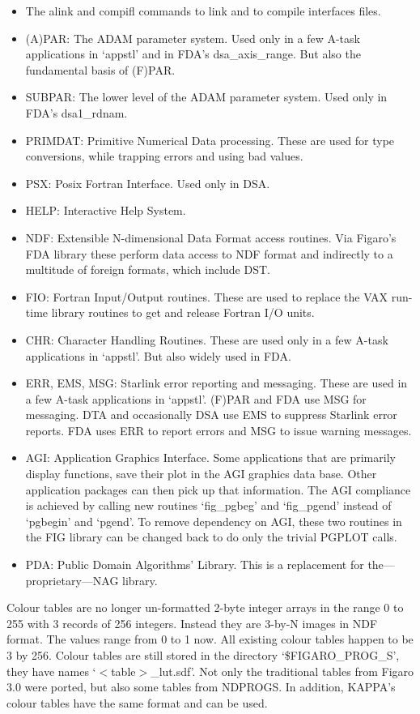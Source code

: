 \documentclass[11pt,twoside]{article}
\newcommand{\latorhtm}[2]{#1}
\newcommand{\latorhtm}[2]{#2}
\begin{document}
\begin{itemize}
\item The alink and compifl commands to link and to compile interfaces
   files.
\item (A)PAR: The ADAM parameter system. Used only in a few A-task
   applications in `appstl' and in FDA's dsa\_axis\_range. But also
   the fundamental basis of (F)PAR.
\item SUBPAR: The lower level of the ADAM parameter system. Used only
   in FDA's dsa1\_\-rdnam.
\item PRIMDAT: Primitive Numerical Data processing. These are used for type
   conversions, while trapping errors and using bad values.
\item PSX: Posix Fortran Interface. Used only in DSA.
\item HELP: Interactive Help System.
\item NDF: Extensible N-dimensional Data Format access routines. Via
   Figaro's FDA library these perform data access to NDF format and
   indirectly to a multitude of foreign formats, which include DST.
\item FIO: Fortran Input/Output routines. These are used to replace the
   VAX run-time library routines to get and release Fortran I/O units.
\item CHR: Character Handling Routines. These are used only in a few
   A-task applications in `appstl'. But also widely used in FDA.
\item ERR, EMS, MSG: Starlink error reporting and messaging. These are
   used in a few A-task applications in `appstl'. (F)PAR and FDA use MSG
   for messaging. DTA and occasionally DSA use EMS to suppress
   Starlink error reports. FDA uses ERR to report errors and MSG to
   issue warning messages.
\item AGI: Application Graphics Interface. Some applications that are
   primarily display functions, save their plot in the AGI graphics data
   base. Other application packages can then pick up that information.
   The AGI compliance is achieved by calling new routines `fig\_pgbeg'
   and `fig\_pgend' instead of `pgbegin' and `pgend'. To remove
   dependency on AGI, these two routines in the FIG library can be
   changed back to do only the trivial PGPLOT calls.
\item PDA: Public Domain Algorithms' Library. This is a replacement for
   the\latorhtm{---}{-}proprietary\latorhtm{---}{-}NAG library.
\end{itemize}

   Colour tables are no longer un-formatted 2-byte integer arrays in the
   range 0 to 255 with 3 records of 256 integers.  Instead they are
   3-by-N images in NDF format.  The values range from 0 to 1 now.  All
   existing colour tables happen to be 3 by 256.  Colour tables are
   still stored in the directory `\$FIGARO\_PROG\_S', they have names
   `$<$table$>$\_lut.sdf'.  Not only the traditional tables from Figaro 3.0
   were ported, but also some tables from NDPROGS.  In addition, KAPPA's
   colour tables have the same format and can be used.
\end{document}
